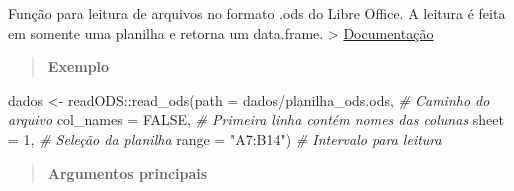 \documentclass[
]{book}
\newenvironment{Shaded}{\begin{snugshade}}{\end{snugshade}}
\newcommand{\AttributeTok}[1]{\textcolor[rgb]{0.77,0.63,0.00}{#1}}
\newcommand{\CommentTok}[1]{\textcolor[rgb]{0.56,0.35,0.01}{\textit{#1}}}
\newcommand{\ConstantTok}[1]{\textcolor[rgb]{0.00,0.00,0.00}{#1}}
\newcommand{\DecValTok}[1]{\textcolor[rgb]{0.00,0.00,0.81}{#1}}
\newcommand{\FunctionTok}[1]{\textcolor[rgb]{0.00,0.00,0.00}{#1}}
\newcommand{\NormalTok}[1]{#1}
\newcommand{\OtherTok}[1]{\textcolor[rgb]{0.56,0.35,0.01}{#1}}
\newcommand{\SpecialCharTok}[1]{\textcolor[rgb]{0.00,0.00,0.00}{#1}}
\newcommand{\StringTok}[1]{\textcolor[rgb]{0.31,0.60,0.02}{#1}}
\theoremstyle{definition}
\theoremstyle{definition}
\theoremstyle{definition}
\theoremstyle{definition}
\theoremstyle{remark}
\begin{document}
Função para leitura de arquivos no formato .ods do Libre Office. A leitura é feita em somente uma planilha e retorna um data.frame.
\textgreater{} \href{https://www.rdocumentation.org/packages/readODS/versions/1.7.0/topics/read_ods}{Documentação}

\begin{quote}
\textbf{Exemplo}
\end{quote}

\begin{Shaded}
\begin{Highlighting}[]
\NormalTok{dados }\OtherTok{\textless{}{-}}\NormalTok{ readODS}\SpecialCharTok{::}\FunctionTok{read\_ods}\NormalTok{(}\AttributeTok{path =} \StringTok{\textquotesingle{}dados/planilha\_ods.ods\textquotesingle{}}\NormalTok{,  }\CommentTok{\# Caminho do arquivo}
                           \AttributeTok{col\_names =} \ConstantTok{FALSE}\NormalTok{,                }\CommentTok{\# Primeira linha contém nomes das colunas}
                           \AttributeTok{sheet =} \DecValTok{1}\NormalTok{,                        }\CommentTok{\# Seleção da planilha}
                           \AttributeTok{range =} \StringTok{"A7:B14"}\NormalTok{)                 }\CommentTok{\# Intervalo para leitura}
\end{Highlighting}
\end{Shaded}

\begin{quote}
\textbf{Argumentos principais}
\end{quote}
\end{document}

